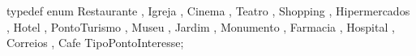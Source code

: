 typedef enum { Restaurante
             , Igreja
             , Cinema
             , Teatro
             , Shopping
             , Hipermercados
             , Hotel
             , PontoTurismo
             , Museu
             , Jardim
             , Monumento
             , Farmacia
             , Hospital
             , Correios
             , Cafe
             } TipoPontoInteresse;

